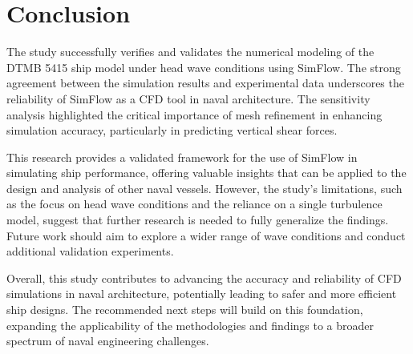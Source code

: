 \documentclass[12pt]{article} %
\begin{document}
\section{Conclusion}
The study successfully verifies and validates the numerical modeling of the DTMB 5415 ship model 
under head wave conditions using SimFlow. The strong agreement between the simulation results and 
experimental data underscores the reliability of SimFlow as a CFD tool in naval architecture. The 
sensitivity analysis highlighted the critical importance of mesh refinement in enhancing simulation 
accuracy, particularly in predicting vertical shear forces.

This research provides a validated framework for the use of SimFlow in simulating ship performance, 
offering valuable insights that can be applied to the design and analysis of other naval vessels. 
However, the study's limitations, such as the focus on head wave conditions and the reliance on a 
single turbulence model, suggest that further research is needed to fully generalize the findings. 
Future work should aim to explore a wider range of wave conditions and conduct additional validation experiments.

Overall, this study contributes to advancing the accuracy and reliability of CFD simulations in 
naval architecture, potentially leading to safer and more efficient ship designs. The recommended 
next steps will build on this foundation, expanding the applicability of the methodologies and 
findings to a broader spectrum of naval engineering challenges.
\end{document}
